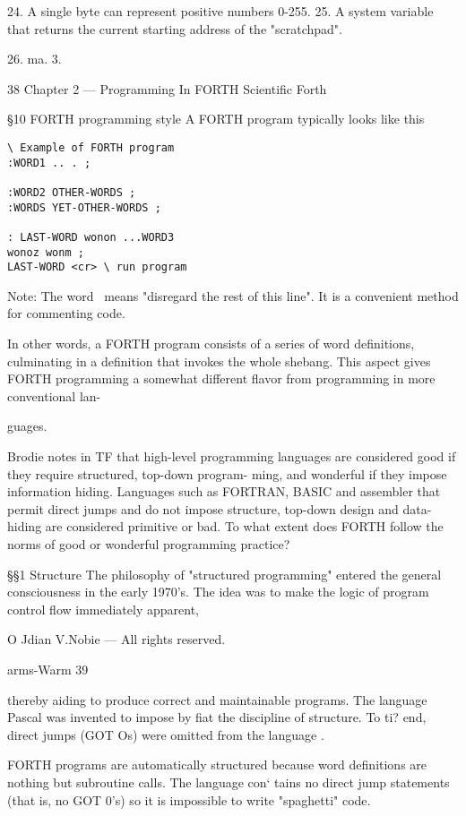  

24. A single byte can represent positive numbers 0-255.
25. A system variable that returns the current starting address of the "scratchpad".

26. ma. 3.

38 Chapter 2 — Programming In FORTH Scientific Forth

§10 FORTH programming style
A FORTH program typically looks like this

\begin{verbatim}
\ Example of FORTH program
:WORD1 .. . ;

:WORD2 OTHER-WORDS ;
:WORDS YET-OTHER-WORDS ;

: LAST-WORD wonon ...WORD3
wonoz wonm ;
LAST-WORD <cr> \ run program
\end{verbatim}

Note: The word \ means "disregard the rest of this line". It is a
convenient method for commenting code.

In other words, a FORTH program consists of a series of word
definitions, culminating in a definition that invokes the whole
shebang. This aspect gives FORTH programming a somewhat
different ﬂavor from programming in more conventional lan-

guages.

Brodie notes in TF that high-level programming languages are
considered good if they require structured, top-down program-
ming, and wonderful if they impose information hiding. Languages
such as FORTRAN, BASIC and assembler that permit direct
jumps and do not impose structure, top-down design and data-
hiding are considered primitive or bad. To what extent does
FORTH follow the norms of good or wonderful programming
practice?

§§1 Structure
The philosophy of "structured programming" entered the
general consciousness in the early 1970’s. The idea was to
make the logic of program control flow immediately apparent,

O Jdian V.Nobie — All rights reserved.

arms-Warm 39

thereby aiding to produce correct and maintainable programs.
The language Pascal was invented to impose by fiat the discipline
of structure. To ti? end, direct jumps (GOT Os) were omitted
from the language .

FORTH programs are automatically structured because word
definitions are nothing but subroutine calls. The language con‘
tains no direct jump statements (that is, no GOT 0's) so it is
impossible to write "spaghetti" code.

